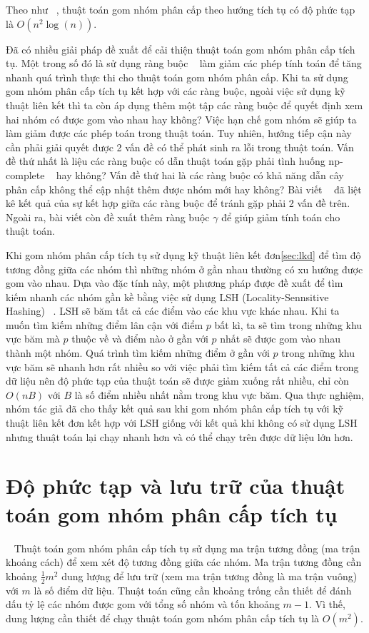 Theo như ~\cite{wiki-HAC}, thuật toán gom nhóm phân cấp theo hướng tích tụ có độ phức tạp là $O(n^2\log(n))$.

Đã có nhiều giải pháp đề xuất để cải thiện thuật toán gom nhóm phân cấp tích tụ.
Một trong số đó là sử dụng ràng buộc ~\cite{hac-constraints} làm giảm các phép tính toán để tăng nhanh quá trình thực thi cho thuật toán gom nhóm phân cấp.
Khi ta sử dụng gom nhóm phân cấp tích tụ kết hợp với các ràng buộc, ngoài việc sử dụng kỹ thuật liên kết thì ta còn áp dụng thêm một tập các ràng buộc để quyết định xem hai nhóm có được gom vào nhau hay không?
Việc hạn chế gom nhóm sẽ giúp ta làm giảm được các phép toán trong thuật toán.
Tuy nhiên, hướng tiếp cận này cần phải giải quyết được 2 vấn đề có thể phát sinh ra lỗi trong thuật toán.
Vấn đề thứ nhất là liệu các ràng buộc có dẫn thuật toán gặp phải tình huống np-complete ~\cite{np-complete} hay không?
Vấn đề thứ hai là các ràng buộc có khả năng dẫn cây phân cấp không thể cập nhật thêm được nhóm mới hay không?
Bài viết ~\cite{hac-constraints} đã liệt kê kết quả của sự kết hợp giữa các ràng buộc để tránh gặp phải 2 vấn đề trên.
Ngoài ra, bài viết còn đề xuất thêm ràng buộc $\gamma$ để giúp giảm tính toán cho thuật toán.

Khi gom nhóm phân cấp tích tụ sử dụng kỹ thuật liên kết đơn\ref{sec:lkd} để tìm độ tương đồng giữa các nhóm thì những nhóm ở gần nhau thường có xu hướng được gom vào nhau.
Dựa vào đặc tính này, một phương pháp được đề xuất để tìm kiếm nhanh   các nhóm gần kề bằng việc sử dụng LSH (Locality-Sennsitive Hashing) ~\cite{single-link-hash}.
LSH sẽ băm tất cả các điểm vào các khu vực khác nhau.
Khi ta muốn tìm kiếm những điểm lân cận với điểm $p$ bất kì, ta sẽ tìm trong những khu vực băm mà $p$ thuộc về và điểm nào ở gần với $p$ nhất sẽ được gom vào nhau thành một nhóm.
Quá trình tìm kiếm những điểm ở gần với $p$ trong những khu vực băm sẽ nhanh hơn rất nhiều so với việc phải tìm kiếm tất cả các điểm trong dữ liệu nên độ phức tạp của thuật toán sẽ được giảm xuống rất nhiều, chỉ còn $O(nB)$ với $B$ là số điểm nhiều nhất nằm trong khu vực băm.
Qua thực nghiệm, nhóm tác giả đã cho thấy kết quả sau khi gom nhóm phân cấp tích tụ với kỹ thuật liên kết đơn kết hợp với LSH giống với kết quả khi không có sử dụng LSH nhưng thuật toán lại chạy nhanh hơn và có thể chạy trên được dữ liệu lớn hơn.

\section{Độ phức tạp và lưu trữ của thuật toán gom nhóm phân cấp tích tụ}
\label{sec:dpt}
~\cite{Vipin-Kumar} Thuật toán gom nhóm phân cấp tích tụ sử dụng ma trận tương đồng (ma trận khoảng cách) để xem xét độ tương đồng giữa các nhóm.
Ma trận tương đồng cần khoảng $\frac{1}{2} m^2$ dung lượng để lưu trữ (xem ma trận tương đồng là ma trận vuông) với $m$ là số điểm dữ liệu.
Thuật toán cũng cần khoảng trống cần thiết để đánh dấu tỷ lệ các nhóm được gom với tổng số nhóm và tốn khoảng $m - 1$.
Vì thế, dung lượng cần thiết để chạy thuật toán gom nhóm phân cấp tích tụ là $O(m^2)$.

